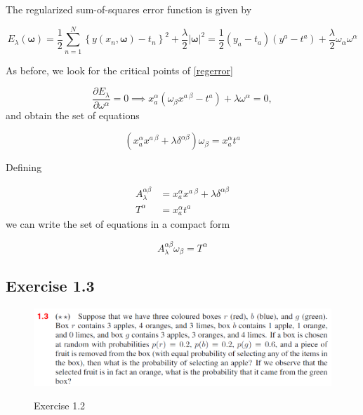 \documentclass[11pt]{article}
\def\bo{\boldsymbol{\omega}}
\begin{document}
The regularized sum-of-squares error function is given by

\begin{equation}\label{regerror}
    E_{\lambda}(\bo) = \frac{1}{2} \sum_{n = 1}^{N} \left\{ y(x_{n}, \bo) - t_{n} \right\}^2 + \frac{\lambda}{2} |\bo|^{2} = \frac{1}{2}\left( y_{a} - t_{a} \right) \left( y^{a} - t^{a} \right)+ \frac{\lambda}{2} \omega_{\alpha} \omega^{\alpha}
\end{equation}

As before, we look for the critical points of \eqref{regerror}

\begin{equation}
    \frac{\partial E_{\lambda}}{\partial \omega^{\alpha}} = 0 \implies x^{\alpha}_{a} \left( \omega_{\beta} x^{a \ \beta} - t^{a} \right)  + \lambda \omega^{\alpha}= 0,
\end{equation}
and obtain the set of equations

\begin{equation}\boxed{
     \left( x^{\alpha}_{a}  x^{a \ \beta}  + \lambda \delta^{ \alpha \beta 
     } \right)   \omega_{\beta}=x^{\alpha}_{a}  t^{a}}
\end{equation}

Defining 

\begin{align}
    A^{\alpha \beta}_{\lambda} &= x^{\alpha}_{a}  x^{a \ \beta}  + \lambda \delta^{ \alpha \beta 
    } \\
    T^{\alpha} &= x^{\alpha}_{a}  t^{a}
\end{align}
we can write the set of equations in a compact form

\begin{equation}\boxed{
    A^{\alpha \beta}_{\lambda} \omega_{\beta} = T^{\alpha}}
\end{equation}

\subsection{Exercise 1.3}
\begin{figure}[H]
\centering
        {\includegraphics[width=\linewidth]{ex1.3.png}}
        \caption{Exercise 1.2}\label{ex1.2}
        \label{ex1.3}
\end{figure}
\end{document}

